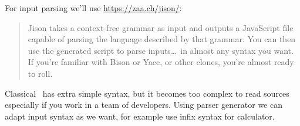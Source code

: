 {}\label{jslexer}

For input parsing we'll use \url{https://zaa.ch/jison/}:
\begin{quote}
Jison takes a context-free grammar as input and outputs a JavaScript file
capable of parsing the language described by that grammar. You can then use the
generated script to parse inputs\ldots\ in almost any syntax you want. If you’re
familiar with Bison or Yacc, or other clones, you’re almost ready to roll.
\end{quote}

\noindent Classical \F\ has extra simple syntax, but it becomes too complex to
read sources especially if you work in a team of developers. Using parser
generator we can adapt input syntax as we want, for example use infix syntax for
calculator.
